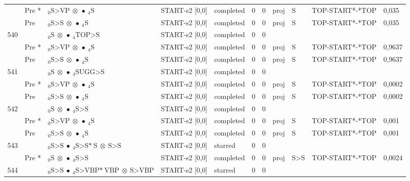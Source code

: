 \documentclass[10pt]{article}
\begin{document}
\begin{longtable}[htbp]{lllllllllll}
 & Pre *& $ {}_0 \textrm{S>VP} \  \otimes \  \bullet \ {}_{4} \textrm{S} $ & START-s2 [0,0] & completed & 0 & 0 & proj & S & TOP-START*-*TOP & 0,035 \\ 
 & Pre & $ {}_0 \textrm{S>S} \  \otimes \  \bullet \ {}_{4} \textrm{S} $ & START-s2 [0,0] & completed & 0 & 0 & proj & S & TOP-START*-*TOP & 0,035 \\ 
540 & & $ {}_0 \textrm{S} \  \otimes \  \bullet \ {}_{4} \textrm{TOP>S} $ & START-s2 [0,0] & completed & 0 & 0 & & & & \\ 
 & Pre *& $ {}_0 \textrm{S>VP} \  \otimes \  \bullet \ {}_{4} \textrm{S} $ & START-s2 [0,0] & completed & 0 & 0 & proj & S & TOP-START*-*TOP & 0,9637 \\ 
 & Pre & $ {}_0 \textrm{S>S} \  \otimes \  \bullet \ {}_{4} \textrm{S} $ & START-s2 [0,0] & completed & 0 & 0 & proj & S & TOP-START*-*TOP & 0,9637 \\ 
541 & & $ {}_0 \textrm{S} \  \otimes \  \bullet \ {}_{4} \textrm{SUGG>S} $ & START-s2 [0,0] & completed & 0 & 0 & & & & \\ 
 & Pre *& $ {}_0 \textrm{S>VP} \  \otimes \  \bullet \ {}_{4} \textrm{S} $ & START-s2 [0,0] & completed & 0 & 0 & proj & S & TOP-START*-*TOP & 0,0002 \\ 
 & Pre & $ {}_0 \textrm{S>S} \  \otimes \  \bullet \ {}_{4} \textrm{S} $ & START-s2 [0,0] & completed & 0 & 0 & proj & S & TOP-START*-*TOP & 0,0002 \\ 
542 & & $ {}_0 \textrm{S} \  \otimes \  \bullet \ {}_{4} \textrm{S>S} $ & START-s2 [0,0] & completed & 0 & 0 & & & & \\ 
 & Pre *& $ {}_0 \textrm{S>VP} \  \otimes \  \bullet \ {}_{4} \textrm{S} $ & START-s2 [0,0] & completed & 0 & 0 & proj & S & TOP-START*-*TOP & 0,001 \\ 
 & Pre & $ {}_0 \textrm{S>S} \  \otimes \  \bullet \ {}_{4} \textrm{S} $ & START-s2 [0,0] & completed & 0 & 0 & proj & S & TOP-START*-*TOP & 0,001 \\ 
543 & & $ {}_0 \textrm{S>S} \  \bullet \ {}_{4} \textrm{S>S*} \ \textrm{S} \  \otimes \ \textrm{S>S} $ & START-s2 [0,0] & starred & 0 & 0 & & & & \\ 
 & Pre *& $ {}_0 \textrm{S} \  \otimes \  \bullet \ {}_{4} \textrm{S>S} $ & START-s2 [0,0] & completed & 0 & 0 & proj & S>S & TOP-START*-*TOP & 0,0024 \\ 
544 & & $ {}_0 \textrm{S>S} \  \bullet \ {}_{4} \textrm{S>VBP*} \ \textrm{VBP} \  \otimes \ \textrm{S>VBP} $ & START-s2 [0,0] & starred & 0 & 0 & & & & \\ 

\end{longtable}
\end{document}
